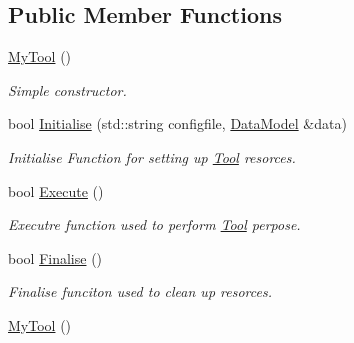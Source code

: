 \subsection*{Public Member Functions}
\begin{DoxyCompactItemize}
\item 
\hypertarget{classMyTool_ad85b796bdd675ae22e69cf40fe7b6314}{\hyperlink{classMyTool_ad85b796bdd675ae22e69cf40fe7b6314}{My\-Tool} ()}\label{classMyTool_ad85b796bdd675ae22e69cf40fe7b6314}

\begin{DoxyCompactList}\small\item\em Simple constructor. \end{DoxyCompactList}\item 
bool \hyperlink{classMyTool_a3bf60061195a18542c4cfb2916b9dad9}{Initialise} (std\-::string configfile, \hyperlink{classDataModel}{Data\-Model} \&data)
\begin{DoxyCompactList}\small\item\em Initialise Function for setting up \hyperlink{classTool}{Tool} resorces. \end{DoxyCompactList}\item 
\hypertarget{classMyTool_a0a58122023af90b9200d0e71e89cfb36}{bool \hyperlink{classMyTool_a0a58122023af90b9200d0e71e89cfb36}{Execute} ()}\label{classMyTool_a0a58122023af90b9200d0e71e89cfb36}

\begin{DoxyCompactList}\small\item\em Executre function used to perform \hyperlink{classTool}{Tool} perpose. \end{DoxyCompactList}\item 
\hypertarget{classMyTool_a060ec6356451aa335d0de41093c9992f}{bool \hyperlink{classMyTool_a060ec6356451aa335d0de41093c9992f}{Finalise} ()}\label{classMyTool_a060ec6356451aa335d0de41093c9992f}

\begin{DoxyCompactList}\small\item\em Finalise funciton used to clean up resorces. \end{DoxyCompactList}\item 
\hypertarget{classMyTool_ad85b796bdd675ae22e69cf40fe7b6314}{\hyperlink{classMyTool_ad85b796bdd675ae22e69cf40fe7b6314}{My\-Tool} ()}\label{classMyTool_ad85b796bdd675ae22e69cf40fe7b6314}


\end{DoxyCompactItemize}

